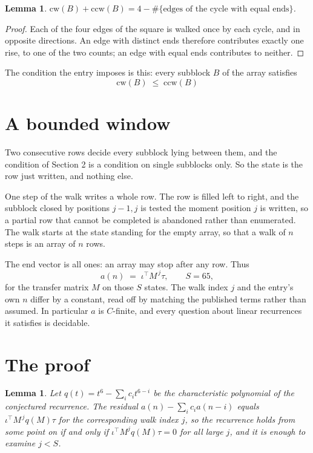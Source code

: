 \documentclass[11pt,a4paper]{article}
\theoremstyle{plain}
\newtheorem{lemma}[theorem]{Lemma}
\theoremstyle{definition}
\begin{document}
\begin{lemma}\label{lem:sum}
$\mathrm{cw}(B)+\mathrm{ccw}(B)=4-\#\{\text{edges of the cycle with equal ends}\}$.
\end{lemma}

\begin{proof}
Each of the four edges of the square is walked once by each cycle, and in opposite directions.
An edge with distinct ends therefore contributes exactly one rise, to one of the two counts;
an edge with equal ends contributes to neither.
\end{proof}

The condition the entry imposes is this: every subblock $B$ of the array satisfies
\[
\mathrm{cw}(B)\;\le\;\mathrm{ccw}(B)
\]


\section{A bounded window}

Two consecutive rows decide every subblock lying between them, and the condition of Section 2 is a condition on single subblocks only. So the state is the row just written, and nothing else.

One step of the walk writes a whole row. The row is filled left to right, and the subblock
closed by positions $j-1,j$ is tested the moment position $j$ is written, so a partial row that
cannot be completed is abandoned rather than enumerated. The walk starts at the state standing
for the empty array, so that a walk of $n$ steps is an array of $n$ rows.

The end vector is all ones: an array may stop after any row. Thus
\[
a(n)\;=\;\iota^{\!\top}M^{\,j}\tau ,\qquad S=65,
\]
for the transfer matrix $M$ on those $S$ states. The walk index $j$ and the entry's own $n$
differ by a constant, read off by matching the published terms rather than assumed. In
particular $a$ is $C$-finite, and every question about linear recurrences it satisfies is
decidable.

\section{The proof}

\begin{lemma}\label{lem:crit}
Let $q(t)=t^{6}-\sum_i c_it^{6-i}$ be the characteristic polynomial of the
conjectured recurrence. The residual $a(n)-\sum_ic_ia(n-i)$ equals
$\iota^{\!\top}M^{\,j}q(M)\tau$ for the corresponding walk index $j$, so the recurrence
holds from some point on if and only if $\iota^{\!\top}M^{j}q(M)\tau=0$ for all large $j$,
and it is enough to examine $j<S$.
\end{lemma}
\end{document}
